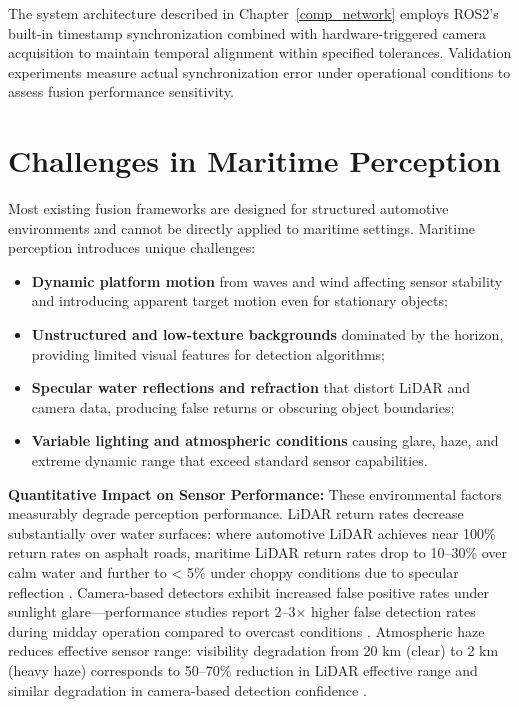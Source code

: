\documentclass{erauthesis}
\begin{document}
The system architecture described in Chapter~\ref{comp_network} employs ROS2's built-in timestamp synchronization combined with hardware-triggered camera acquisition to maintain temporal alignment within specified tolerances. Validation experiments measure actual synchronization error under operational conditions to assess fusion performance sensitivity.


\section{Challenges in Maritime Perception}

Most existing fusion frameworks are designed for structured automotive environments and cannot be directly applied to maritime settings. Maritime perception introduces unique challenges:
\begin{itemize}
    \item \textbf{Dynamic platform motion} from waves and wind affecting sensor stability and introducing apparent target motion even for stationary objects;
    \item \textbf{Unstructured and low-texture backgrounds} dominated by the horizon, providing limited visual features for detection algorithms;
    \item \textbf{Specular water reflections and refraction} that distort LiDAR and camera data, producing false returns or obscuring object boundaries;
    \item \textbf{Variable lighting and atmospheric conditions} causing glare, haze, and extreme dynamic range that exceed standard sensor capabilities.
\end{itemize}

\textbf{Quantitative Impact on Sensor Performance:} These environmental factors measurably degrade perception performance. LiDAR return rates decrease substantially over water surfaces: where automotive LiDAR achieves near 100\% return rates on asphalt roads, maritime LiDAR return rates drop to 10–30\% over calm water and further to < 5\% under choppy conditions due to specular reflection \cite{halterman2015}. Camera-based detectors exhibit increased false positive rates under sunlight glare—performance studies report 2–3× higher false detection rates during midday operation compared to overcast conditions \cite{prasad2017}. Atmospheric haze reduces effective sensor range: visibility degradation from 20 km (clear) to 2 km (heavy haze) corresponds to 50–70\% reduction in LiDAR effective range and similar degradation in camera-based detection confidence \cite{bijelic2020}.
\end{document}
